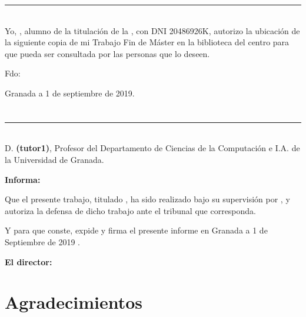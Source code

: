 \noindent\rule[-1ex]{\textwidth}{2pt}\\[4.5ex]

Yo, \textbf{\myName}, alumno de la titulación \myDegree de la \textbf{\myFaculty}, con DNI 20486926K, autorizo la
ubicación de la siguiente copia de mi Trabajo Fin de Máster en la biblioteca del centro para que pueda ser
consultada por las personas que lo deseen.

\vspace{6cm}

\noindent Fdo: \myName

\vspace{2cm}

\begin{flushright}
Granada a 1 de septiembre de 2019.
\end{flushright}


\chapter*{}
\thispagestyle{empty}

\noindent\rule[-1ex]{\textwidth}{2pt}\\[4.5ex]

D. \textbf{\myProf (tutor1)}, Profesor del Departamento de Ciencias de la Computación e I.A. de la Universidad de Granada.

\vspace{0.5cm}

\textbf{Informa:}

\vspace{0.5cm}

Que el presente trabajo, titulado \textit{\textbf{\myTitle}},
ha sido realizado bajo su supervisión por \textbf{\myName}, y autoriza la defensa de dicho trabajo ante el tribunal que corresponda.

\vspace{0.5cm}

Y para que conste, expide y firma el presente informe en Granada a 1 de Septiembre de 2019 .

\vspace{1cm}

\textbf{El director:}

\vspace{5cm}

\noindent \textbf{\myProf}

\chapter*{Agradecimientos}
\thispagestyle{empty}

